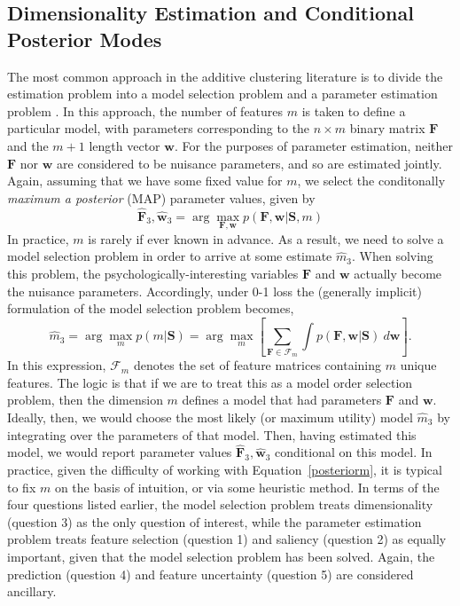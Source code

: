 \documentclass[11pt]{article}
\newcommand{\condon}{|}
\begin{document}
\subsection{Dimensionality Estimation and Conditional Posterior Modes}

The most common approach in the additive clustering literature is to divide the estimation problem into a model selection problem and a parameter estimation problem \cite{tenenbaum96,arabiec80,ruml02}. In this approach, the number of features $m$ is taken to define a particular model, with parameters corresponding to the $n \times m$ binary matrix $\mathbf{F}$ and the $m+1$ length vector $\mathbf{w}$. For the purposes of parameter estimation, neither $\mathbf{F}$ nor $\mathbf{w}$ are considered to be nuisance parameters, and so are estimated jointly. Again, assuming that we have some fixed value for $m$, we select the conditonally {\it maximum a posterior} (MAP) parameter values, given by
    \begin{equation}
    \hat{\mathbf{F}}_3, \hat{\mathbf{w}}_3 = \arg \max_{\mathbf{F},\mathbf{w}}
    p(\mathbf{F},\mathbf{w}     \condon \mathbf{S}, m)
    \label{constantmmap}
    \end{equation}
In practice, $m$ is rarely if ever known in advance. As a result, we need to solve a model selection problem in order to arrive at some estimate $\hat{m}_3$. When solving this problem, the psychologically-interesting variables $\mathbf{F}$ and $\mathbf{w}$ actually become the nuisance parameters. Accordingly, under 0-1 loss the (generally implicit) formulation of the model selection problem becomes,
    \begin{equation}
    \hat{m}_3 = \arg \max_m p(m \condon \mathbf{S}) = \arg \max_m \left[ \sum_{\mathbf{F} \in \mathcal{F}_m} \int
    p(\mathbf{F}, \mathbf{w} \condon \mathbf{S}) \ d\mathbf{w} \right].
    \label{posteriorm}
    \end{equation}
In this expression, $\mathcal{F}_m$ denotes the set of feature matrices containing $m$ unique features. The logic is that if we are to treat this as a model order selection problem, then the dimension $m$ defines a model that had parameters $\mathbf{F}$ and $\mathbf{w}$. Ideally, then, we would choose the most likely (or maximum utility) model $\hat{m}_3$ by integrating over the parameters of that model. Then, having estimated this model, we would report parameter values $\hat{\mathbf{F}}_3, \hat{\mathbf{w}}_3$ conditional on this model. In practice, given the difficulty of working with Equation~\ref{posteriorm}, it is typical to fix $m$ on the basis of intuition, or via some heuristic method. In terms of the four questions listed earlier, the model selection problem treats dimensionality (question 3) as the only question of interest, while the parameter estimation problem treats feature selection (question 1) and saliency (question 2) as equally important, given that the model selection problem has been solved. Again, the prediction (question 4) and feature uncertainty (question 5) are considered ancillary.
\end{document}
